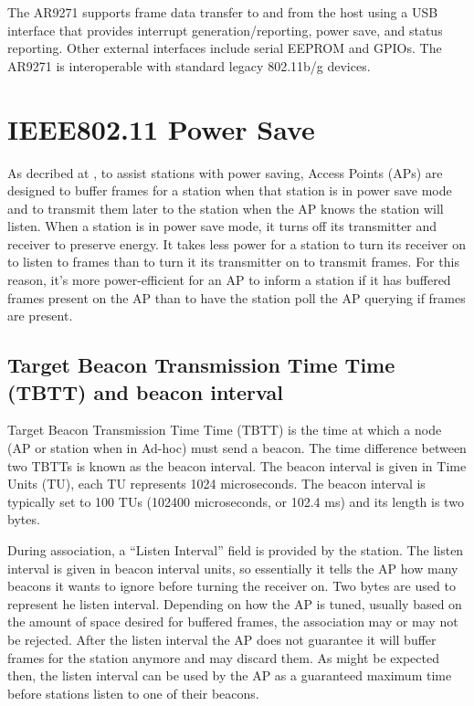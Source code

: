 The AR9271 supports frame data transfer to and from the host using a USB interface that provides interrupt generation/reporting, power save, and status reporting. Other external interfaces include serial EEPROM and GPIOs. The AR9271 is interoperable with standard legacy 802.11b/g devices.

\section{IEEE802.11 Power Save}
\label{sec:powersaveieee80211}

As decribed at \cite{cite-powersavestandard}, to assist stations with power saving, Access Points (APs) are designed to buffer frames for a station when that station is in power save mode and to transmit them later to the station when the AP knows the station will listen. When a station is in power save mode, it turns off its transmitter and receiver to preserve energy. It takes less power for a station to turn its receiver on to listen to frames than to turn it its transmitter on to transmit frames. For this reason, it's more power-efficient for an AP to inform a station if it has buffered frames present on the AP than to have the station poll the AP querying if frames are present.

\subsection{Target Beacon Transmission Time Time (TBTT) and beacon interval}
\label{sub-sec:proj-tbtt}

Target Beacon Transmission Time Time (TBTT) is the time at which a node (AP or station when in Ad-hoc) must send a beacon. The time difference between two TBTTs is known as the beacon interval. The beacon interval is given in Time Units (TU), each TU represents 1024 microseconds. The beacon interval is typically set to 100 TUs (102400 microseconds, or 102.4 ms) and its length is two bytes.

During association, a “Listen Interval” field is provided by the station. The listen interval is given in beacon interval units, so essentially it tells the AP how many beacons it wants to ignore before turning the receiver on. Two bytes are used to represent he listen interval. Depending on how the AP is tuned, usually based on the amount of space desired for buffered frames, the association may or may not be rejected. After the listen interval the AP does not guarantee it will buffer frames for the station anymore and may discard them. As might be expected then, the listen interval can be used by the AP as a guaranteed maximum time before stations listen to one of their beacons.

